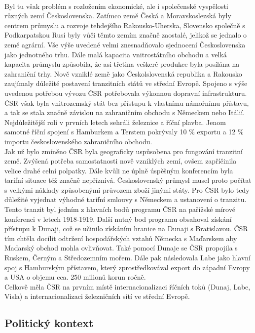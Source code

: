 \documentclass{article}
\begin{document}
{\\\indent Byl tu však problém s rozložením ekonomické, ale i společenské vyspělosti různých zemí Československa. Zatímco země Česká a Moravskoslezská byly centrem průmyslu a rozvoje tehdejšího Rakousko-Uherska, Slovensko společně s Podkarpatskou Rusí byly vůči těmto zemím značně zaostalé, jelikož se jednalo o země agrární. Vše výše uvedené velmi znesnadňovalo sjednocení Československa jako jednotného trhu. Dále malá kapacita vnitrostátního obchodu a velká kapacita průmyslu způsobila, že asi třetina veškeré produkce byla posílána na zahraniční trhy. Nově vzniklé země jako Českolslovenská republika a Rakousko zaujímaly důležité postavení tranzitních států ve střední Evropě. Spojeno s výše uvedenou potřebou vývozu ČSR potřebovala výkonnou dopravní infrastrukturu. ČSR však byla vnitrozemský stát bez přístupu k vlastnímu námořnímu přístavu, a tak se stala značně závislou na zahraničním obchodu s Německem nebo Itálií. Nejdůležitější roli v prvních letech sehráli železnice a říční plavba. Jenom samotné říční spojení s Hamburkem a Terstem pokrývaly 10 \% exportu a 12 \% importu československého zahraničního obchodu.
\\\indent Jak už bylo zmíněno ČSR byla geograficky uspůsobena pro fungování tranzitní země. Zvýšená potřeba samostatnosti nově vzniklých zemí, ovšem zapříčinila velice drahé celní polpatky. Dále kvůli ne úplně úspěšným konferencím byla tarifní situace též značně nepříznivá. Československý průmysl musel proto počítat s velkými náklady způsobenými průvozem zboží jinými státy. Pro ČSR bylo tedy důležité vyjednat výhodné tarifní smlouvy s Německem a ustanovení o tranzitu. Tento tranzit byl jedním z hlavních bodů programu ČSR na pařížské mírové konferenci v letech 1918-1919. Další nutný bod programu obsahoval získání přístupu k Dunaji, což se učinilo získáním hranice na Dunaji s Bratislavou. ČSR tím chtěla docílit odtržení hospodářských vztahů Německa s Maďarskem aby Maďarský obchod mohla ovlivňovat. Také pomocí Dunaje se ČSR propojila s Ruskem, Černým a Středozemním mořem. Dále pak následovala Labe jako hlavní spoj s Hamburským přístavem, který zprostředkovával export do západní Evropy a USA o objemu cca. 250 milionů korun ročně.
\\\indent Celkově měla ČSR na prvním místě internacionalizaci říčních toků (Dunaj, Labe, Visla) a internacionalizaci železničních sítí ve střední Evropě. }

\subsection{Politický kontext}
\end{document}
